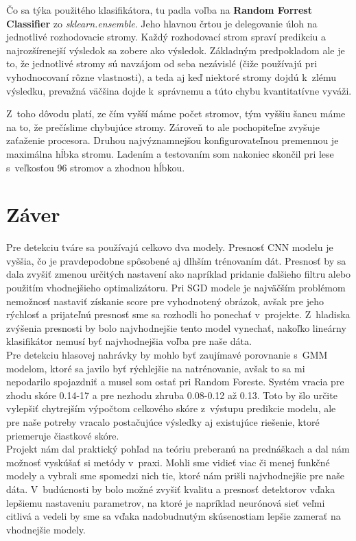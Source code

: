 \documentclass[11pt, a4paper]{article}
\begin{document}
			Čo sa týka použitého klasifikátora, tu padla voľba na \textbf{Random Forrest Classifier} zo \emph{sklearn.ensemble}. Jeho hlavnou črtou je delegovanie úloh na jednotlivé rozhodovacie stromy. Každý rozhodovací strom spraví predikciu a najrozšírenejší výsledok sa zobere ako výsledok. Základným predpokladom ale je to, že jednotlivé stromy sú navzájom od seba nezávislé (čiže používajú pri vyhodnocovaní rôzne vlastnosti), a teda aj keď niektoré stromy dojdú k~zlému výsledku, prevažná väčšina dojde k~správnemu a túto chybu kvantitatívne vyváži.
			
			Z~toho dôvodu platí, ze čím vyšší máme počet stromov, tým vyššiu šancu máme na to, že prečíslime chybujúce stromy. Zároveň to ale pochopiteľne zvyšuje zaťaženie procesora. Druhou najvýznamnejšou konfigurovateľnou premennou je maximálna hĺbka stromu.
			Ladením a testovaním som nakoniec skončil pri lese s~veľkosťou 96 stromov a zhodnou hĺbkou.
\newpage
\section{Záver}
	Pre detekciu tváre sa používajú celkovo dva modely. Presnosť CNN modelu je vyššia, čo je pravdepodobne spôsobené aj dlhším trénovaním dát. Presnosť by sa dala zvyšiť zmenou určitých nastavení ako napríklad pridanie ďalšieho filtru alebo použitím vhodnejšieho optimalizátoru. Pri SGD modele je najväčším problémom nemožnosť nastaviť získanie score pre vyhodnotený obrázok, avšak pre jeho rýchlosť a prijateľnú presnosť sme sa rozhodli ho ponechať v~projekte. Z~hladiska zvýšenia presnosti by bolo najvhodnejšie tento model vynechať, nakoľko lineárny klasifikátor nemusí byť najvhodnejšia voľba pre naše dáta. 
\\

	Pre detekciu hlasovej nahrávky by mohlo byť zaujímavé porovnanie s~GMM modelom, ktoré sa javilo byť rýchlejšie na natrénovanie, avšak to sa mi nepodarilo spojazdniť a musel som ostať pri Random Foreste. Systém vracia pre zhodu skóre 0.14-17 a pre nezhodu zhruba 0.08-0.12 až 0.13. Toto by šlo určite vylepšiť chytrejším výpočtom celkového skóre z~výstupu predikcie modelu, ale pre naše potreby vracalo postačujúce výsledky aj existujúce riešenie, ktoré priemeruje čiastkové skóre.
	\\
	
	Projekt nám dal praktický pohľad na teóriu preberanú na prednáškach a dal nám možnosť vyskúšať si metódy v~praxi. Mohli sme vidieť viac či menej funkčné modely a vybrali sme spomedzi nich tie, ktoré nám prišli najvhodnejšie pre naše dáta. V~budúcnosti by bolo možné zvyšiť kvalitu a presnosť detektorov vďaka lepšiemu nastaveniu parametrov, na ktoré je napríklad neurónová sieť veľmi citlivá a vedeli by sme sa vďaka nadobudnutým skúsenostiam lepšie zamerať na vhodnejšie modely.
\end{document}
